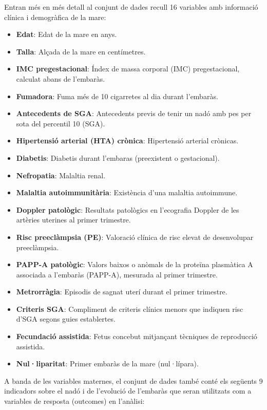\documentclass[../main.tex]{subfiles}
\begin{document}
    Entran més en més detall al conjunt de dades recull 16 variables amb informació clínica i demogràfica de la mare:
    \small{
    \begin{itemize}
        \item \textbf{Edat}: Edat de la mare en anys.
        \item \textbf{Talla}: Alçada de la mare en centímetres.
        \item \textbf{IMC pregestacional}: Índex de massa corporal (IMC) pregestacional, calculat abans de l’embaràs.
        \item \textbf{Fumadora}: Fuma més de 10 cigarretes al dia durant l’embaràs.
        \item \textbf{Antecedents de SGA}: Antecedents previs de tenir un nadó amb pes per sota del percentil 10 (SGA).
        \item \textbf{Hipertensió arterial (HTA) crònica}: Hipertensió arterial crònicas.
        \item \textbf{Diabetis}: Diabetis durant l'embaras (preexistent o gestacional).
        \item \textbf{Nefropatia}: Malaltia renal.
        \item \textbf{Malaltia autoimmunitària}: Existència d’una malaltia autoimmune.
        \item \textbf{Doppler patològic}: Resultats patològics en l’ecografia Doppler de les artèries uterines al primer trimestre.
        \item \textbf{Risc preeclàmpsia (PE)}: Valoració clínica de risc elevat de desenvolupar preeclàmpsia.
        \item \textbf{PAPP-A patològic}: Valors baixos o anòmals de la proteïna plasmàtica A associada a l’embaràs (PAPP-A), mesurada al primer trimestre.
        \item \textbf{Metrorràgia}: Episodis de sagnat uterí durant el primer trimestre.
        \item \textbf{Criteris SGA}: Compliment de criteris clínics menors que indiquen risc d’SGA segons guies establertes.
        \item \textbf{Fecundació assistida}: Fetus concebut mitjançant tècniques de reproducció assistida.
        \item \textbf{Nul·liparitat}: Primer embaràs de la mare (nul·lípara).
    \end{itemize}
    }

    A banda de les variables maternes, el conjunt de dades també conté els següents 9 indicadors sobre el nadó i de l’evolució de l’embaràs que seran utilitzats com a variables de resposta (outcomes) en l’anàlisi:
    
\end{document}
